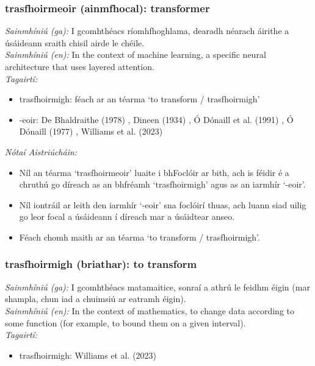 \subsubsection*{trasfhoirmeoir (ainmfhocal): transformer}
 \noindent \textit{Sainmhíniú (ga):} I gcomhthéacs ríomhfhoghlama, dearadh néarach áirithe a úsáideann sraith chisil airde le chéile.
\\
 \noindent \textit{Sainmhíniú (en):} In the context of machine learning, a specific neural architecture that uses layered attention.
\\
 \noindent \textit{Tagairtí:}
\begin{itemize}
	\item trasfhoirmigh: féach ar an téarma `to transform / trasfhoirmigh'
	\item -eoir: De Bhaldraithe (1978) \cite{de-bhaldraithe}, Dineen (1934) \cite{dineen}, Ó Dónaill et al. (1991) \cite{focloir-beag}, Ó Dónaill (1977) \cite{odonaill}, Williams et al. (2023) \cite{storchiste}
\end{itemize}

 \noindent \textit{Nótaí Aistriúcháin:}
\begin{itemize}
	\item Níl an téarma `trasfhoirmeoir' luaite i bhFoclóir ar bith, ach is féidir é a chruthú go díreach as an bhfréamh `trasfhoirmigh' agus as an iarmhír `-eoir'.
	\item Níl iontráil ar leith den iarmhír `-eoir' sna foclóirí thuas, ach luann siad uilig go leor focal a úsáideann í díreach mar a úsáidtear anseo.
	\item Féach chomh maith ar an téarma `to transform / trasfhoirmigh'.
\end{itemize}


\subsubsection*{trasfhoirmigh (briathar): to transform}
 \noindent \textit{Sainmhíniú (ga):} I gcomhthéacs matamaitice, sonraí a athrú le feidhm éigin (mar shampla, chun iad a chuimsiú ar eatramh éigin).
\\
 \noindent \textit{Sainmhíniú (en):} In the context of mathematics, to change data according to some function (for example, to bound them on a given interval).
\\
 \noindent \textit{Tagairtí:}
\begin{itemize}
	\item trasfhoirmigh: Williams et al. (2023) \cite{storchiste}
\end{itemize}

